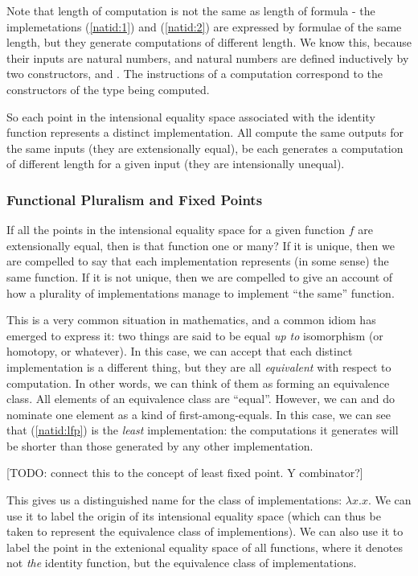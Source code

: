 \documentclass{article}
\begin{document}
Note that length of computation is not the same as length of formula -
the implemetations (\ref{natid:1}) and (\ref{natid:2}) are expressed
by formulae of the same length, but they generate computations of
different length. We know this, because their inputs are natural
numbers, and natural numbers are defined inductively by two
constructors, \Znat and \Snat. The instructions of a computation
correspond to the constructors of the type being computed.

So each point in the intensional equality space associated with the
identity function represents a distinct implementation. All compute
the same outputs for the same inputs (they are extensionally equal),
be each generates a computation of different length for a given input
(they are intensionally unequal).

\subsubsection{Functional Pluralism and Fixed Points}

If all the points in the intensional equality space for a given
function \(f\) are extensionally equal, then is that function one or
many? If it is unique, then we are compelled to say that each
implementation represents (in some sense) the same function. If it is
not unique, then we are compelled to give an account of how a
plurality of implementations manage to implement ``the same''
function.

This is a very common situation in mathematics, and a common idiom has
emerged to express it: two things are said to be equal \textit{up to}
isomorphism (or homotopy, or whatever). In this case, we can accept
that each distinct implementation is a different thing, but they are
all \textit{equivalent} with respect to computation. In other words,
we can think of them as forming an equivalence class. All elements of
an equivalence class are ``equal''. However, we can and do nominate
one element as a kind of first-among-equals. In this case, we can see
that (\ref{natid:lfp}) is the \textit{least} implementation: the
computations it generates will be shorter than those generated by any
other implementation.

[TODO: connect this to the concept of least fixed point. Y combinator?]

This gives us a distinguished name for the class of implementations:
\(\lambda x.x\). We can use it to label the origin of its intensional
equality space (which can thus be taken to represent the equivalence
class of implementions). We can also use it to label the point in the
extenional equality space of all functions, where it denotes not
\textit{the} identity function, but the equivalence class of
implementations.
\end{document}
